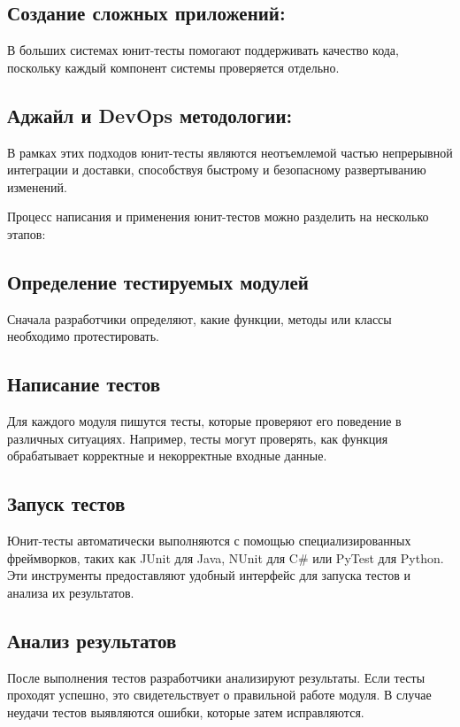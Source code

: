     \subsection*{Создание сложных приложений:}
    В больших системах юнит-тесты помогают поддерживать качество кода, поскольку каждый компонент системы проверяется отдельно. 

    \subsection*{Аджайл и DevOps методологии:}
    В рамках этих подходов юнит-тесты являются неотъемлемой частью непрерывной интеграции и доставки, способствуя быстрому и безопасному развертыванию изменений.

    Процесс написания и применения юнит-тестов можно разделить на несколько этапов: 

    \subsection{Определение тестируемых модулей}
    Сначала разработчики определяют, какие функции, методы или классы необходимо протестировать. 

    \subsection{Написание тестов}
    Для каждого модуля пишутся тесты, которые проверяют его поведение в различных ситуациях. Например, тесты могут проверять, как функция обрабатывает корректные и некорректные входные данные. 

    \subsection*{Запуск тестов}
    Юнит-тесты автоматически выполняются с помощью специализированных фреймворков, таких как JUnit для Java, NUnit для C\# или PyTest для Python. Эти инструменты предоставляют удобный интерфейс для запуска тестов и анализа их результатов. 

    \subsection*{Анализ результатов}
    После выполнения тестов разработчики анализируют результаты. Если тесты проходят успешно, это свидетельствует о правильной работе модуля. В случае неудачи тестов выявляются ошибки, которые затем исправляются. 

